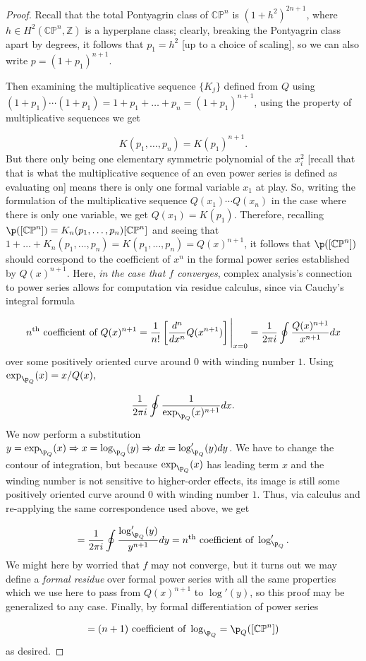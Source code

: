 \begin{proof}
Recall that the total Pontyagrin class of $\mathbb{CP}^n$ is $(1 + h^2)^{2n+1}$, where $h \in H^2 (\mathbb{CP}^n, \mathbb{Z})$ is a hyperplane class; clearly, breaking the Pontyagrin class apart by degrees, it follows that $p_1 = h^2$ [up to a choice of scaling], so we can also write $p = (1 + p_1)^{n+1}$.  

Then examining the multiplicative sequence $\{K_j \}$ defined from $Q$ using $(1 + p_1) \cdots (1 + p_1) = 1 + p_1 + \dots + p_n = (1 + p_1)^{n+1}$, using the property of multiplicative sequences we get

\[K(p_1, \dots, p_n) = K(p_1)^{n+1}.\]
But there only being one elementary symmetric polynomial of the $x_i^2$ [recall that that is what the multiplicative sequence of an even power series is defined as evaluating on] means there is only one formal variable $x_1$ at play. So, writing the formulation of the multiplicative sequence $Q(x_1) \cdots Q(x_n)$ in the case where there is only one variable, we get $Q(x_1) = K(p_1)$. Therefore, recalling $\p([\mathbb{CP}^n]) = K_n (p_1, \dots, p_n)[\mathbb{CP}^n]$ and seeing that $1 + \dots + K_n(p_1, \dots, p_n) = K(p_1, \dots, p_n) =Q(x)^{n+1}$, it follows that $\p([\mathbb{CP}^n])$ should correspond to the coefficient of $x^n$ in the formal power series established by $Q(x)^{n+1}$. Here, \textit{in the case that $f$ converges}, complex analysis's connection to power series allows for computation via residue calculus, since via Cauchy's integral formula

\[n^{\text{th}} \text{ coefficient of } Q(x)^{n+1} = \frac{1}{n!}  \left[ \frac{d^n}{dx^n} Q(x^{n+1}) \right] \Bigg{|}_{x = 0}  = \frac{1}{ 2 \pi i} \oint \frac{Q(x)^{n+1}}{x^{n+1}}  dx\]
over some positively oriented curve around $0$ with winding number $1$. Using $\exp_{\p_Q}(x) = x/Q(x),$

\[  \frac{1}{ 2 \pi i} \oint \frac{1}{\exp_{\p_Q}(x)^{n+1}}  dx.\]
We now perform a substitution $y = \exp_{\p_Q}(x) \Rightarrow x = \log_{\p_Q}(y) \Rightarrow dx = \log_{\p_Q}'(y) dy$. We have to change the contour of integration, but because $\exp_{\p_Q} (x)$ has leading term $x$ and the winding number is not sensitive to higher-order effects, its image is still some positively oriented curve around $0$ with winding number $1$. Thus, via calculus and re-applying the same correspondence used above, we get

\[ = \frac{1}{2 \pi i} \oint \frac{\log'_{\p_Q} (y)}{y^{n+1}} dy = n^{\text{th}} \text{ coefficient of } \log_{\p_Q}'.\]
We might here by worried that $f$ may not converge,  but it turns out we may define a \textit{formal residue} over formal power series with all the same properties which we use here to pass from $Q(x)^{n+1}$ to $\log'(y)$, so this proof  may be generalized to any case. Finally, by formal differentiation of power series

\[ = (n+1)\text{ coefficient of } \log_{\p_Q} = \p_Q ([\mathbb{CP}^n])\]
as desired.
\end{proof}

